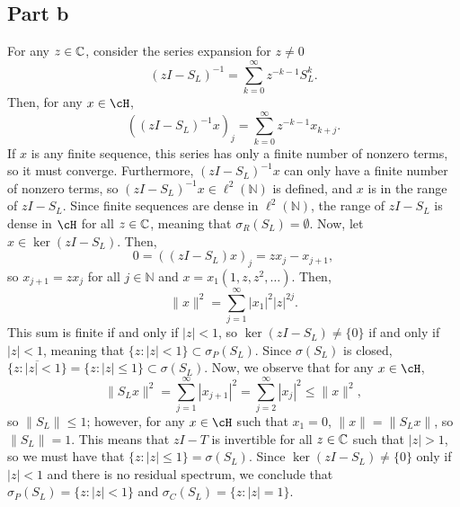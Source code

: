 \documentclass{article}
\begin{document}
\subsection{Part b}
For any $z\in\mathbb{C}$, consider the series expansion for $z\neq0$
\[
(zI-S_L)^{-1}=\sum_{k=0}^\infty z^{-k-1}S^k_L.
\]
Then, for any $x\in\cH$,
\[
\left((zI-S_L)^{-1}x\right)_j=\sum_{k=0}^\infty z^{-k-1}x_{k+j}.
\]
If $x$ is any finite sequence, this series has only a finite number of nonzero terms, so it must converge. Furthermore, $(zI-S_L)^{-1}x$ can only have a finite number of nonzero terms, so $(zI-S_L)^{-1}x\in\ell^2(\mathbb{N})$ is defined, and $x$ is in the range of $zI-S_L$. Since finite sequences are dense in $\ell^2(\mathbb{N})$, the range of $zI-S_L$ is dense in $\cH$ for all $z\in\mathbb{C}$, meaning that $\sigma_R(S_L)=\emptyset$. Now, let $x\in\ker(zI-S_L)$. Then,
\[
0=\left((zI-S_L)x\right)_j=zx_j-x_{j+1},
\]
so $x_{j+1}=zx_j$ for all $j\in\mathbb{N}$ and $x=x_1(1,z,z^2,\ldots)$. Then,
\[
\|x\|^2=\sum_{j=1}^{\infty}|x_1|^2|z|^{2j}.
\]
This sum is finite if and only if $|z|<1$, so $\ker(zI-S_L)\neq\{0\}$ if and only if $|z|<1$, meaning that $\{z:|z|<1\}\subset\sigma_P(S_L)$. Since $\sigma(S_L)$ is closed, $\overline{\{z:|z|<1\}}=\{z:|z|\leq1\}\subset\sigma(S_L)$. Now, we observe that for any $x\in\cH$,
\[
\|S_Lx\|^2=\sum_{j=1}^{\infty}|x_{j+1}|^2=\sum_{j=2}^{\infty}|x_j|^2\leq\|x\|^2,
\]
so $\|S_L\|\leq1$; however, for any $x\in\cH$ such that $x_1=0$, $\|x\|=\|S_Lx\|$, so $\|S_L\|=1$. This means that $zI-T$ is invertible for all $z\in\mathbb{C}$ such that $|z|>1$, so we must have that $\{z:|z|\leq1\}=\sigma(S_L)$. Since $\ker(zI-S_L)\neq\{0\}$ only if $|z|<1$ and there is no residual spectrum, we conclude that $\sigma_P(S_L)=\{z:|z|<1\}$ and $\sigma_C(S_L)=\{z:|z|=1\}$.
\end{document}
